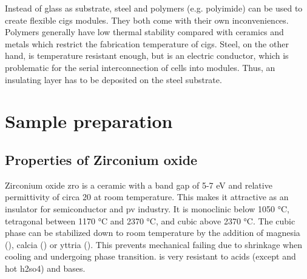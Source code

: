 %
Instead of glass as substrate, steel and polymers (e.g. polyimide\cite{feurer2017cigs}) can be used to create flexible \gls{cigs} modules. 
They both come with their own inconveniences. 
Polymers generally have low thermal stability compared with ceramics and metals which restrict the fabrication temperature of \gls{cigs}.
Steel, on the other hand, is temperature resistant enough, but is an electric conductor, which is problematic for the serial interconnection of cells into modules. 
Thus, an insulating layer has to be deposited on the steel substrate. 

\pagebreak[4]

\section{Sample preparation}
\subsection{Properties of Zirconium oxide}
Zirconium oxide \gls{zro} is a ceramic with a band gap of 5-7 eV\cite{Anwar2017} and relative permittivity of circa 20 at room temperature\cite{kukli2001dielectric}. 
This makes it attractive as an insulator for semiconductor and \gls{pv} industry. 
It is monoclinic below 1050 °C, tetragonal between 1170 °C and 2370 °C, and cubic above 2370 °C\cite{Nielsen2005}.
The cubic phase can be stabilized down to room temperature by the addition of magnesia (), calcia () or yttria (). 
This prevents mechanical failing due to shrinkage 
when cooling and undergoing phase transition\cite{Nielsen2005}.
 is very resistant to acids (except  and hot \gls{h2so4}) and bases\cite{Nielsen2005}.

